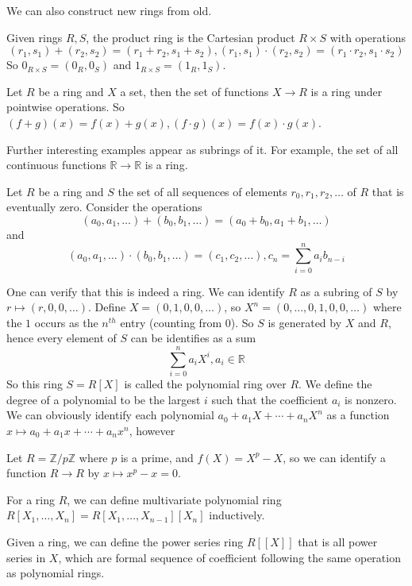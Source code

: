 We can also construct new rings from old.
\begin{definition}
    Given rings $R,S$, the product ring is the Cartesian product $R\times S$ with operations
    $$(r_1,s_1)+(r_2,s_2)=(r_1+r_2,s_1+s_2),(r_1,s_1)\cdot(r_2,s_2)=(r_1\cdot r_2,s_1\cdot s_2)$$
    So $0_{R\times S}=(0_R,0_S)$ and $1_{R\times S}=(1_R,1_S)$.
\end{definition}
\begin{definition}
    Let $R$ be a ring and $X$ a set, then the set of functions $X\to R$ is a ring under pointwise operations.
    So $(f+g)(x)=f(x)+g(x),(f\cdot g)(x)=f(x)\cdot g(x)$.
\end{definition}
Further interesting examples appear as subrings of it.
For example, the set of all continuous functions $\mathbb R\to\mathbb R$ is a ring.
\begin{definition}
    Let $R$ be a ring and $S$ the set of all sequences of elements $r_0,r_1,r_2,\ldots$ of $R$ that is eventually zero.
    Consider the operations
    $$(a_0,a_1,\ldots)+(b_0,b_1,\ldots)=(a_0+b_0,a_1+b_1,\ldots)$$
    and
    $$(a_0,a_1,\ldots)\cdot (b_0,b_1,\ldots)=(c_1,c_2,\ldots),c_n=\sum_{i=0}^na_ib_{n-i}$$
\end{definition}
One can verify that this is indeed a ring.
We can identify $R$ as a subring of $S$ by $r\mapsto (r,0,0,\ldots)$.
Define $X=(0,1,0,0,\ldots)$, so $X^n=(0,\ldots,0,1,0,0,\ldots)$ where the $1$ occurs as the $n^{th}$ entry (counting from $0$).
So $S$ is generated by $X$ and $R$, hence every element of $S$ can be identifies as a sum
$$\sum_{i=0}^na_iX^i,a_i\in\mathbb R$$
So this ring $S=R[X]$ is called the polynomial ring over $R$.
We define the degree of a polynomial to be the largest $i$ such that the coefficient $a_i$ is nonzero.\\
We can obviously identify each polynomial $a_0+a_1X+\cdots +a_nX^n$ as a function $x\mapsto a_0+a_1x+\cdots +a_nx^n$, however
\begin{remark}
    Let $R=\mathbb Z/p\mathbb Z$ where $p$ is a prime, and $f(X)=X^p-X$, so we can identify a function $R\to R$ by $x\mapsto x^p-x=0$.
\end{remark}
\begin{definition}
    For a ring $R$, we can define multivariate polynomial ring $R[X_1,\ldots,X_n]=R[X_1,\ldots,X_{n-1}][X_n]$ inductively.
\end{definition}
\begin{definition}
    Given a ring, we can define the power series ring $R[[X]]$ that is all power series in $X$, which are formal sequence of coefficient following the same operation as polynomial rings.
\end{definition}

